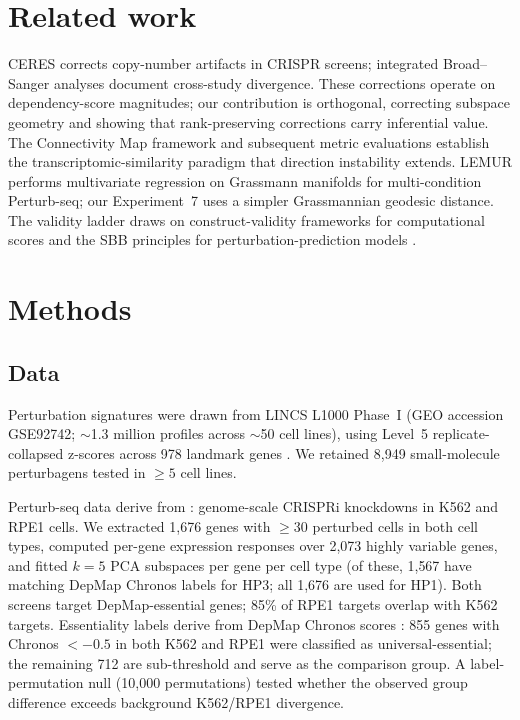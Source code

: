 \documentclass{article}
\begin{document}
\section{Related work}

CERES \citep{meyers2017ceres} corrects copy-number artifacts in CRISPR
screens; integrated Broad--Sanger analyses \citep{pacini2021integrated}
document cross-study divergence. These corrections operate on
dependency-score magnitudes; our contribution is orthogonal, correcting
subspace geometry and showing that rank-preserving corrections carry
inferential value. The Connectivity Map framework
\citep{subramanian2017next,lamb2006connectivity} and subsequent metric
evaluations \citep{li2020comprehensive} establish the
transcriptomic-similarity paradigm that direction instability extends.
LEMUR \citep{ahlmanneltze2025lemur} performs multivariate regression on
Grassmann manifolds for multi-condition Perturb-seq; our Experiment~7 uses
a simpler Grassmannian geodesic distance. The validity ladder draws on
construct-validity frameworks for computational scores
\citep{freiesleben2025benchmarking,watson2025measuring} and the SBB
principles for perturbation-prediction models \citep{sbb2026principles}.

\section{Methods}

\subsection{Data}

Perturbation signatures were drawn from LINCS L1000 Phase~I (GEO accession
GSE92742; $\sim$1.3 million profiles across $\sim$50 cell lines),
using Level~5 replicate-collapsed z-scores across 978 landmark genes
\citep{subramanian2017next}. We retained 8{,}949 small-molecule
perturbagens tested in $\geq5$ cell lines.

Perturb-seq data derive from \citet{replogle2022mapping}: genome-scale
CRISPRi knockdowns in K562 and RPE1 cells. We extracted 1{,}676 genes
with $\geq$30 perturbed cells in both cell types, computed per-gene
expression responses over 2{,}073 highly variable genes, and fitted
$k = 5$ PCA subspaces per gene per cell type (of these, 1{,}567 have
matching DepMap Chronos labels for HP3; all 1{,}676 are used for HP1).
Both screens target DepMap-essential genes; 85\% of RPE1 targets overlap
with K562 targets. Essentiality labels derive from DepMap Chronos scores
\citep{dempster2021chronos}: 855 genes with Chronos $< -0.5$ in both
K562 and RPE1 were classified as universal-essential; the remaining 712
are sub-threshold and serve as the comparison group. A label-permutation
null (10{,}000 permutations) tested whether the observed group difference
exceeds background K562/RPE1 divergence.
\end{document}
